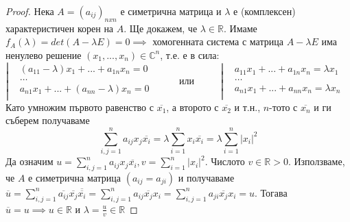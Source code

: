 \documentclass{article}
\begin{document}
\begin{proof}
Нека $A = (a_{ij})_{nxn}$ е симетрична матрица и $\lambda$ е (комплексен) характеристичен корен на $A$. Ще докажем, че $\lambda
\in \mathbb{R}$. \newline
Имаме $f_A(\lambda) = det(A - \lambda E) = 0 \implies$ хомогенната система с матрица $A - \lambda E$ има ненулево решение
$(x_1, ..., x_n) \in \mathbb{C}^n$, т.е. е в сила: \newline\newline
$\left| \begin{aligned}
    & (a_{11} - \lambda)x_1 + ... + a_{1n}x_n = 0 \\
    & \hdots  \\
    & a_{n1}x_1 + ... + (a_{nn} - \lambda)x_n = 0 \\
\end{aligned}\right. \hspace{1cm}$
или $\hspace{1cm} \left| \begin{aligned}
    & a_{11}x_1 + ... + a_{1n}x_n = \lambda x_1 \\
    & \hdots  \\
    & a_{n1}x_1 + ... + a_{nn}x_n = \lambda x_n \\
\end{aligned}\right.$ \newline\newline
Като умножим първото равенство с $\overline{x_1}$, а второто с $\overline{x_2}$ и т.н., $n$-тото с $\overline{x_n}$ и ги съберем
получаваме $$\sum_{i, j = 1}^{n}a_{ij}x_j\overline{x_i} = \lambda \sum_{i = 1}^{n}x_i\overline{x_i} = \lambda \sum_{i = 1}^{n}|x_i|^2$$
Да означим $u = \sum_{i, j = 1}^{n}a_{ij}x_j\overline{x_i}, v = \sum_{i = 1}^{n}|x_i|^2$. Числото $v \in \mathbb{R} > 0$.
Използваме, че $A$ е симетрична матрица $(a_{ij} = a_{ji})$ и получаваме $\overline{u} = \sum_{i, j = 1}^{n}\overline{a_{ij}}
\overline{x_j}\overline{\overline{x_i}} = \sum_{i, j = 1}^{n}a_{ij}\overline{x_j}x_i = \sum_{i, j = 1}^{n}a_{ji}\overline{x_j}
x_i = u$. Тогава $\overline{u} = u \implies u \in \mathbb{R}$ и $\lambda = \frac{u}{v} \in \mathbb{R}$
\end{proof}
\end{document}
